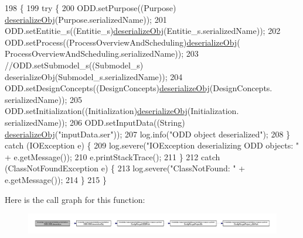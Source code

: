 \begin{DoxyCode}
198                                     \{
199         \textcolor{keywordflow}{try} \{
200             ODD.setPurpose((Purpose) \hyperlink{classit_1_1isislab_1_1masonassisteddocumentation_1_1_o_d_d_1_1_o_d_d_a75152526b3e9c34426668dd578544240}{deserializeObj}(Purpose.serializedName));
201             ODD.setEntitie\_s((Entitie\_s)\hyperlink{classit_1_1isislab_1_1masonassisteddocumentation_1_1_o_d_d_1_1_o_d_d_a75152526b3e9c34426668dd578544240}{deserializeObj}(Entitie\_s.serializedName));
202             ODD.setProcess((ProcessOverviewAndScheduling)\hyperlink{classit_1_1isislab_1_1masonassisteddocumentation_1_1_o_d_d_1_1_o_d_d_a75152526b3e9c34426668dd578544240}{deserializeObj}(
      ProcessOverviewAndScheduling.serializedName));
203             \textcolor{comment}{//ODD.setSubmodel\_s((Submodel\_s) deserializeObj(Submodel\_s.serializedName));}
204             ODD.setDesignConcepts((DesignConcepts)\hyperlink{classit_1_1isislab_1_1masonassisteddocumentation_1_1_o_d_d_1_1_o_d_d_a75152526b3e9c34426668dd578544240}{deserializeObj}(DesignConcepts.
      serializedName));
205             ODD.setInitialization((Initialization)\hyperlink{classit_1_1isislab_1_1masonassisteddocumentation_1_1_o_d_d_1_1_o_d_d_a75152526b3e9c34426668dd578544240}{deserializeObj}(Initialization.
      serializedName));
206             ODD.setInputData((String) \hyperlink{classit_1_1isislab_1_1masonassisteddocumentation_1_1_o_d_d_1_1_o_d_d_a75152526b3e9c34426668dd578544240}{deserializeObj}(\textcolor{stringliteral}{"inputData.ser"}));
207             log.info(\textcolor{stringliteral}{"ODD object deserialized"});
208         \} \textcolor{keywordflow}{catch} (IOException e) \{
209             log.severe(\textcolor{stringliteral}{"IOException deserializing ODD objects: "} + e.getMessage());
210             e.printStackTrace();
211         \}
212         \textcolor{keywordflow}{catch} (ClassNotFoundException e) \{
213             log.severe(\textcolor{stringliteral}{"ClassNotFound: "} + e.getMessage());
214         \}
215     \}
\end{DoxyCode}


Here is the call graph for this function\-:
\nopagebreak
\begin{figure}[H]
\begin{center}
\leavevmode
\includegraphics[width=350pt]{classit_1_1isislab_1_1masonassisteddocumentation_1_1_o_d_d_1_1_o_d_d_ab7b09ee32af669dfb46f6ca1d4d81f3b_cgraph}
\end{center}
\end{figure}


